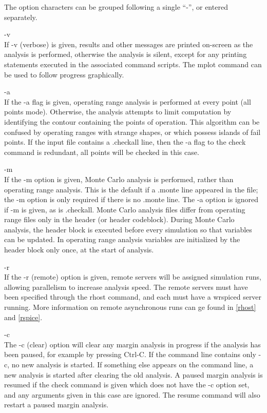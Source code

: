The option characters can be grouped following a single ``{\vt -}'',
or entered separately.

\begin{description}
\item{\vt -v}\\
If {\vt -v} (verbose) is given, results and other messages are printed
on-screen as the analysis is performed, otherwise the analysis is
silent, except for any printing statements executed in the associated
command scripts.  The {\cb mplot} command can be used to follow
progress graphically.

\item{\vt -a}\\
If the {\vt -a} flag is given, operating range analysis is performed
at every point (all points mode).  Otherwise, the analysis attempts to
limit computation by identifying the contour containing the points of
operation.  This algorithm can be confused by operating ranges with
strange shapes, or which possess islands of fail points.  If the input
file contains a {\vt .checkall} line, then the {\vt -a} flag to the
{\cb check} command is redundant, all points will be checked in this
case.

\item{\vt -m}\\
If the {\vt -m} option is given, Monte Carlo analysis is performed,
rather than operating range analysis.  This is the default if a {\vt
.monte} line appeared in the file; the {\vt -m} option is only
required if there is no {\vt .monte} line.  The {\vt -a} option is
ignored if {\vt -m} is given, as is {\vt .checkall}.  Monte Carlo
analysis files differ from operating range files only in the header
(or header codeblock).  During Monte Carlo analysis, the header block
is executed before every simulation so that variables can be updated. 
In operating range analysis variables are initialized by the header
block only once, at the start of analysis.

\item{\vt -r}\\
If the {\vt -r} (remote) option is given, remote servers will be
assigned simulation runs, allowing parallelism to increase analysis
speed.  The remote servers must have been specified through the {\cb
rhost} command, and each must have a {\vt wrspiced} server running. 
More information on remote asynchronous runs can ge found in
\ref{rhost} and \ref{rspice}.

\item{\vt -c}\\
The {\vt -c} (clear) option will clear any margin analysis in progress
if the analysis has been paused, for example by pressing {\kb
Ctrl-C}.  If the command line contains only {\vt -c}, no new
analysis is started.  If something else appears on the command line, a
new analysis is started after clearing the old analysis.  A paused
margin analysis is resumed if the {\cb check} command is given which
does not have the {\vt -c} option set, and any arguments given in this
case are ignored.  The {\cb resume} command will also restart a paused
margin analysis.
\end{description}

